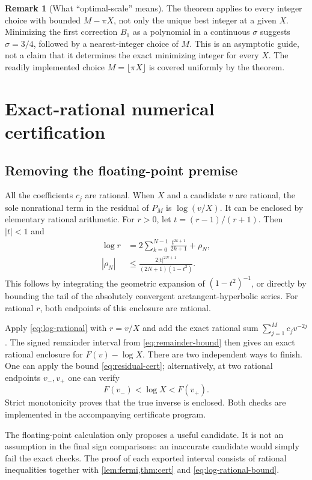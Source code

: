 \documentclass[11pt,a4paper]{article}
\theoremstyle{definition}
\newtheorem{remark}[theorem]{Remark}
\numberwithin{equation}{section}
\begin{document}
\begin{remark}[What ``optimal-scale'' means]
The theorem applies to every integer choice with bounded $M-\pi X$, not only the unique best integer at a given $X$. Minimizing the first correction $B_1$ as a polynomial in a continuous $\sigma$ suggests $\sigma=3/4$, followed by a nearest-integer choice of $M$. This is an asymptotic guide, not a claim that it determines the exact minimizing integer for every $X$. The readily implemented choice $M=\lfloor\pi X\rfloor$ is covered uniformly by the theorem.
\end{remark}

\section{Exact-rational numerical certification}
\label{sec:rational}

\subsection{Removing the floating-point premise}
All the coefficients $c_j$ are rational. When $X$ and a candidate $v$ are rational, the sole nonrational term in the residual of $P_M$ is $\log(v/X)$. It can be enclosed by elementary rational arithmetic. For $r>0$, let $t=(r-1)/(r+1)$. Then $|t|<1$ and
\begin{align}
 \log r&=2\sum_{k=0}^{N-1}\frac{t^{2k+1}}{2k+1}+\rho_N,\label{eq:log-rational}\\
 |\rho_N|&\le\frac{2|t|^{2N+1}}{(2N+1)(1-t^2)}.
 \label{eq:log-rational-bound}
\end{align}
This follows by integrating the geometric expansion of $(1-t^2)^{-1}$, or directly by bounding the tail of the absolutely convergent arctangent-hyperbolic series. For rational $r$, both endpoints of this enclosure are rational.

Apply \eqref{eq:log-rational} with $r=v/X$ and add the exact rational sum $\sum_{j=1}^Mc_jv^{-2j}$. The signed remainder interval from \eqref{eq:remainder-bound} then gives an exact rational enclosure for $F(v)-\log X$. There are two independent ways to finish. One can apply the bound \eqref{eq:residual-cert}; alternatively, at two rational endpoints $v_-,v_+$ one can verify
\[
 F(v_-)<\log X<F(v_+).
\]
Strict monotonicity proves that the true inverse is enclosed. Both checks are implemented in the accompanying certificate program.

The floating-point calculation only proposes a useful candidate. It is not an assumption in the final sign comparisons: an inaccurate candidate would simply fail the exact checks. The proof of each exported interval consists of rational inequalities together with \cref{lem:fermi,thm:cert} and \eqref{eq:log-rational-bound}.
\end{document}
